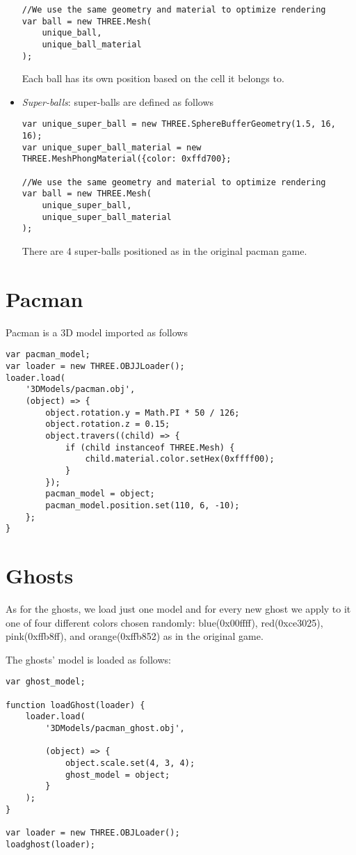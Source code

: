 \documentclass[a4paper,oneside]{report}
\begin{document}
\begin{itemize}
\begin{lstlisting}
//We use the same geometry and material to optimize rendering
var ball = new THREE.Mesh(
	unique_ball,
	unique_ball_material
);
\end{lstlisting}
Each ball has its own position based on the cell it belongs to.
\item \textit{Super-balls}: super-balls are defined as follows
\begin{lstlisting}
var unique_super_ball = new THREE.SphereBufferGeometry(1.5, 16, 16);
var unique_super_ball_material = new THREE.MeshPhongMaterial({color: 0xffd700};

//We use the same geometry and material to optimize rendering
var ball = new THREE.Mesh(
	unique_super_ball,
	unique_super_ball_material
);
\end{lstlisting}
There are 4 super-balls positioned as in the original pacman game.
\end{itemize}

\section{Pacman}
Pacman is a 3D model imported as follows
\begin{lstlisting}
var pacman_model;
var loader = new THREE.OBJJLoader();
loader.load(
	'3DModels/pacman.obj',
	(object) => {
		object.rotation.y = Math.PI * 50 / 126;
		object.rotation.z = 0.15;
		object.travers((child) => {
			if (child instanceof THREE.Mesh) {
				child.material.color.setHex(0xffff00);
			}
		});
		pacman_model = object;
		pacman_model.position.set(110, 6, -10);
	};
}
\end{lstlisting}

\section{Ghosts}
As for the ghosts, we load just one model and for every new ghost we apply to it one of four different colors chosen randomly: blue(0x00ffff), red(0xce3025), pink(0xffb8ff), and orange(0xffb852) as in the original game.

The ghosts' model is loaded as follows:
\begin{lstlisting}
var ghost_model;

function loadGhost(loader) {
    loader.load(
        '3DModels/pacman_ghost.obj', 

        (object) => {
            object.scale.set(4, 3, 4);
            ghost_model = object;
        }
    );
}

var loader = new THREE.OBJLoader();
loadghost(loader);
\end{lstlisting}
\end{document}
